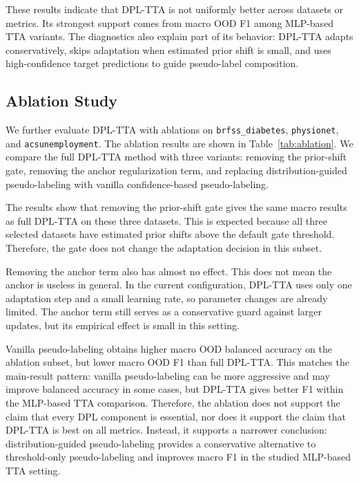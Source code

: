 \documentclass{article}
\begin{document}
These results indicate that DPL-TTA is not uniformly better across datasets or metrics. Its strongest support comes from macro OOD F1 among MLP-based TTA variants. The diagnostics also explain part of its behavior: DPL-TTA adapts conservatively, skips adaptation when estimated prior shift is small, and uses high-confidence target predictions to guide pseudo-label composition.





\subsection{Ablation Study}

We further evaluate DPL-TTA with ablations on \texttt{brfss\_diabetes}, \texttt{physionet}, and \texttt{acsunemployment}. The ablation results are shown in Table~\ref{tab:ablation}. We compare the full DPL-TTA method with three variants: removing the prior-shift gate, removing the anchor regularization term, and replacing distribution-guided pseudo-labeling with vanilla confidence-based pseudo-labeling.

The results show that removing the prior-shift gate gives the same macro results as full DPL-TTA on these three datasets. This is expected because all three selected datasets have estimated prior shifts above the default gate threshold. Therefore, the gate does not change the adaptation decision in this subset.

Removing the anchor term also has almost no effect. This does not mean the anchor is useless in general. In the current configuration, DPL-TTA uses only one adaptation step and a small learning rate, so parameter changes are already limited. The anchor term still serves as a conservative guard against larger updates, but its empirical effect is small in this setting.

Vanilla pseudo-labeling obtains higher macro OOD balanced accuracy on the ablation subset, but lower macro OOD F1 than full DPL-TTA. This matches the main-result pattern: vanilla pseudo-labeling can be more aggressive and may improve balanced accuracy in some cases, but DPL-TTA gives better F1 within the MLP-based TTA comparison. Therefore, the ablation does not support the claim that every DPL component is essential, nor does it support the claim that DPL-TTA is best on all metrics. Instead, it supports a narrower conclusion: distribution-guided pseudo-labeling provides a conservative alternative to threshold-only pseudo-labeling and improves macro F1 in the studied MLP-based TTA setting.
\end{document}
